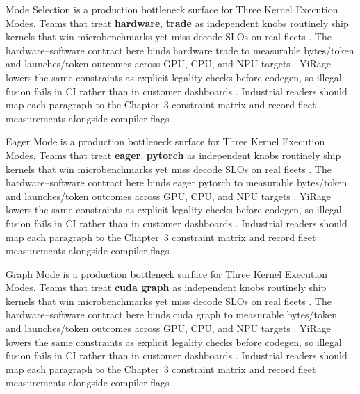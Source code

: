 Mode Selection is a production bottleneck surface for Three Kernel Execution Modes. Teams that treat \textbf{hardware}, \textbf{trade} as independent knobs routinely ship kernels that win microbenchmarks yet miss decode SLOs on real fleets \citep{dlbook,nvidia2024cudagraphs}. The hardware--software contract here binds hardware trade to measurable bytes/token and launches/token outcomes across GPU, CPU, and NPU targets \citep{dao2022flashattention,liu2024deepseekv3}. YiRage lowers the same constraints as explicit legality checks before codegen, so illegal fusion fails in CI rather than in customer dashboards \citep{kwon2023vllm,patel2025llminference}. Industrial readers should map each paragraph to the Chapter~3 constraint matrix and record fleet measurements alongside compiler flags \citep{nvidia2024cudagraphs,taxbreak2026}.

Eager Mode is a production bottleneck surface for Three Kernel Execution Modes. Teams that treat \textbf{eager}, \textbf{pytorch} as independent knobs routinely ship kernels that win microbenchmarks yet miss decode SLOs on real fleets \citep{dao2022flashattention,liu2024deepseekv3}. The hardware--software contract here binds eager pytorch to measurable bytes/token and launches/token outcomes across GPU, CPU, and NPU targets \citep{kwon2023vllm,patel2025llminference}. YiRage lowers the same constraints as explicit legality checks before codegen, so illegal fusion fails in CI rather than in customer dashboards \citep{nvidia2024cudagraphs,taxbreak2026}. Industrial readers should map each paragraph to the Chapter~3 constraint matrix and record fleet measurements alongside compiler flags \citep{liu2024deepseekv3,memoryfloor2026}.

Graph Mode is a production bottleneck surface for Three Kernel Execution Modes. Teams that treat \textbf{cuda graph} as independent knobs routinely ship kernels that win microbenchmarks yet miss decode SLOs on real fleets \citep{kwon2023vllm,patel2025llminference}. The hardware--software contract here binds cuda graph to measurable bytes/token and launches/token outcomes across GPU, CPU, and NPU targets \citep{nvidia2024cudagraphs,taxbreak2026}. YiRage lowers the same constraints as explicit legality checks before codegen, so illegal fusion fails in CI rather than in customer dashboards \citep{liu2024deepseekv3,memoryfloor2026}. Industrial readers should map each paragraph to the Chapter~3 constraint matrix and record fleet measurements alongside compiler flags \citep{patel2025llminference,nvidia2022hopper}.

